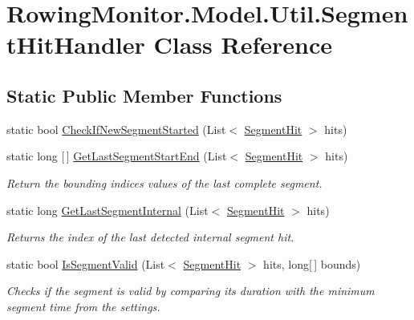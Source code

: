 \hypertarget{class_rowing_monitor_1_1_model_1_1_util_1_1_segment_hit_handler}{}\section{Rowing\+Monitor.\+Model.\+Util.\+Segment\+Hit\+Handler Class Reference}
\label{class_rowing_monitor_1_1_model_1_1_util_1_1_segment_hit_handler}
\subsection*{Static Public Member Functions}
\begin{DoxyCompactItemize}
\item 
static bool \hyperlink{class_rowing_monitor_1_1_model_1_1_util_1_1_segment_hit_handler_adbd44130a8d894cd7c21430c3eedf9e1}{Check\+If\+New\+Segment\+Started} (List$<$ \hyperlink{struct_rowing_monitor_1_1_model_1_1_util_1_1_segment_hit}{Segment\+Hit} $>$ hits)
\item 
static long \mbox{[}$\,$\mbox{]} \hyperlink{class_rowing_monitor_1_1_model_1_1_util_1_1_segment_hit_handler_a75d8b23514da843ef1eebf9e684f8094}{Get\+Last\+Segment\+Start\+End} (List$<$ \hyperlink{struct_rowing_monitor_1_1_model_1_1_util_1_1_segment_hit}{Segment\+Hit} $>$ hits)
\begin{DoxyCompactList}\small\item\em Return the bounding indices values of the last complete segment. \end{DoxyCompactList}\item 
static long \hyperlink{class_rowing_monitor_1_1_model_1_1_util_1_1_segment_hit_handler_ac73a1aebbe85844658b84fd48591c302}{Get\+Last\+Segment\+Internal} (List$<$ \hyperlink{struct_rowing_monitor_1_1_model_1_1_util_1_1_segment_hit}{Segment\+Hit} $>$ hits)
\begin{DoxyCompactList}\small\item\em Returns the index of the last detected internal segment hit. \end{DoxyCompactList}\item 
static bool \hyperlink{class_rowing_monitor_1_1_model_1_1_util_1_1_segment_hit_handler_afe07b33e8ee385a2320a5e6f05d86215}{Is\+Segment\+Valid} (List$<$ \hyperlink{struct_rowing_monitor_1_1_model_1_1_util_1_1_segment_hit}{Segment\+Hit} $>$ hits, long\mbox{[}$\,$\mbox{]} bounds)
\begin{DoxyCompactList}\small\item\em Checks if the segment is valid by comparing its duration with the minimum segment time from the settings. \end{DoxyCompactList}\end{DoxyCompactItemize}



